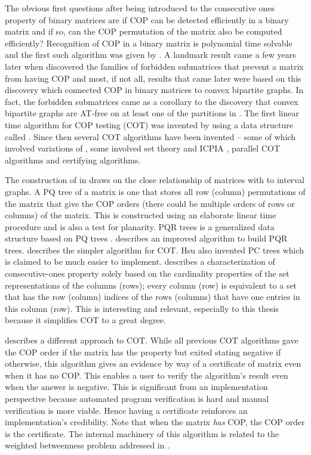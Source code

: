 The obvious first questions after being introduced to the consecutive
ones property of binary matrices are if COP can be detected
efficiently in a binary matrix and if so, can the COP permutation of
the matrix also be computed efficiently?  Recognition of COP in a
binary matrix is polynomial time solvable and the first such algorithm
was given by \cite{fg65}.  A landmark result came a few years later
when \cite{at72} discovered the families of forbidden submatrices that
prevent a matrix from having COP and most, if not all, results that
came later were based on this discovery which connected COP in binary
matrices to convex bipartite graphs. In fact, the forbidden
submatrices came as a corollary to the discovery that convex bipartite
graphs are AT-free on at least one of the partitions in
\cite{at72}. The first linear time algorithm for COP testing (COT) was
invented by \cite{bl76} using a data structure called \PQtrees.  Since
then several COT algorithms have been invented -- some of which
involved variations of \PQtrees \cite{mm96,wlh01,mcc04}, some involved
set theory and ICPIA \cite{wlh02,nsnrs09}, parallel COT
algorithms\cite{as95,bs03,ly91} and certifying algorithms\cite{mcc04}.

The construction of \PQtrees in \cite{bl76} draws on the close
relationship of matrices with \COP to interval graphs. A PQ tree of a
matrix is one that stores all row (column) permutations of the matrix
that give the COP orders (there could be multiple orders of rows or
columns) of the matrix. This is constructed using an elaborate linear
time procedure and is also a test for planarity.  PQR trees is a
generalized data structure based on PQ trees \cite{mm96,mpt98}.
\cite{tm05} describes an improved algorithm to build PQR
trees. \cite{wlh02} describes the simpler algorithm for COT. Hsu also
invented PC trees \cite{wlh01} which is claimed to be much easier to
implement. \cite{nsnrs09} describes a characterization of
consecutive-ones property solely based on the cardinality properties
of the set representations of the columns (rows); every column (row)
is equivalent to a set that has the row (column) indices of the rows
(columns) that have one entries in this column (row). This is
interesting and relevant, especially to this thesis because it
simplifies COT to a great degree.

\cite{mcc04} describes a different approach to COT. While all previous
COT algorithms gave the COP order if the matrix has the property but
exited stating negative if otherwise, this algorithm gives an evidence
by way of a certificate of matrix even when it has no COP. This
enables a user to verify the algorithm's result even when the answer
is negative. This is significant from an implementation perspective
because automated program verification is hard and manual verification
is more viable. Hence having a certificate reinforces an
implementation's credibility. Note that when the matrix {\em has} COP,
the COP order is the certificate.  The internal machinery of this
algorithm is related to the weighted betweenness problem
addressed in \cite{co98}.  

